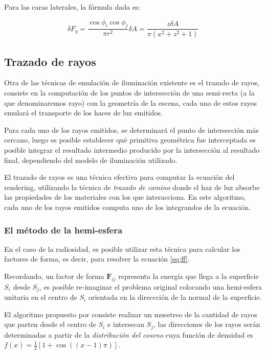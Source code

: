 Para las caras laterales, la fórmula dada es:

\begin{equation}
\delta{F_{q}} = \frac{\cos{\phi_{i}}\cos{\phi_{j}}}{\pi{r^{2}}}\delta{A} = \frac{z\delta{A}}{\pi({x^{2} + z^{2} + 1})}
\end{equation}


\subsection{Trazado de rayos}
\label{sec:raytracing}

Otra de las técnicas de emulación de iluminación existente es el trazado de rayos, consiste en la computación de los puntos de intersección de una semi-recta (a la que denominaremos rayo) con la geometría de la escena, cada uno de estos rayos emulará el transporte de los haces de luz emitidos.

Para cada uno de los rayos emitidos, se determinará el punto de intersección más cercano, luego es posible establecer qué primitiva geométrica fue interceptada es posible integrar el resultado intermedio producido por la intersección al resultado final, dependiendo del modelo de iluminación utilizado.

El trazado de rayos es una técnica efectiva \cite{Kajiya} para computar la ecuación del rendering, utilizando la técnica de \textit{trazado de camino} donde el haz de luz absorbe las propiedades de los materiales con los que interacciona. En este algoritmo, cada uno de los rayos emitidos computa uno de los integrandos de la ecuación.

\subsubsection{El método de la hemi-esfera}

En el caso de la radiosidad, es posible utilizar esta técnica para calcular los factores de forma, es decir, para resolver la ecuación \eqref{eq:ff}.

Recordando, un factor de forma $\mathbf{F}_{ij}$ representa la energía que llega a la superficie $S_{i}$ desde $S_{j}$, es posible re-imaginar el problema original colocando una hemi-esfera unitaria en el centro de $S_{i}$ orientada en la direccción de la normal de la superficie.

El algoritmo propuesto por \citeauthor{Malley}  consiste realizar un muestreo de la cantidad de  rayos que parten desde el centro de $S_{i}$ e intersecan $S_{j}$, las direcciones de los rayos serán determinadas a partir de la \textit{distribución del coseno} cuya función de densidad es $f(x) = \frac{1}{2}[1 + \cos((x-1)\pi)]$.

